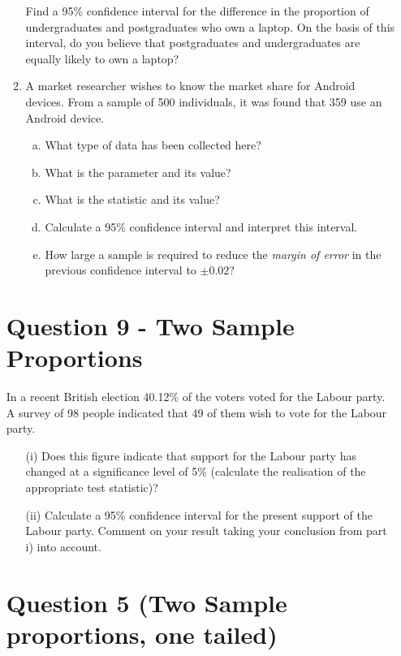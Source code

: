 \documentclass[]{report}
\begin{document}
\begin{enumerate}
\begin{enumerate}
Find a 95\% confidence interval for the difference in the proportion of undergraduates and postgraduates who own a laptop. On the basis of this interval, do you believe that postgraduates and undergraduates are
equally likely to own a laptop?

\item 
A market researcher wishes to know the market share for Android devices. From a sample of 500 individuals, it was found that 359 use an Android device.\\[-0.2cm]
\begin{enumerate}[(a)]
\item What type of data has been collected here?  
\item What is the parameter and its value?  
\item What is the statistic and its value?  
\item Calculate a 95\% confidence interval and interpret this interval.  
\item How large a sample is required to reduce the \emph{margin of error} in the previous confidence interval to $\pm 0.02$?
\end{enumerate}
\end{enumerate}

	
	\normalsize
	\section*{Question 9 - Two Sample Proportions}
	In a recent British election 40.12\% of the voters voted for the Labour party. A survey of 98 people indicated that 49 of them wish to vote for the Labour party. 
	\begin{itemize}
		\item[(i)] Does this figure indicate that support for the Labour party has changed at a significance level of 5\% (calculate the realisation of the appropriate test statistic)? 
		\item[(ii)] Calculate a 95\% confidence interval for the present support of the Labour party. Comment on your result taking your conclusion from part i) into account. 
	\end{itemize}
	
	\section*{Question 5 (Two Sample proportions, one tailed)}
	

\end{enumerate}
\end{document}
